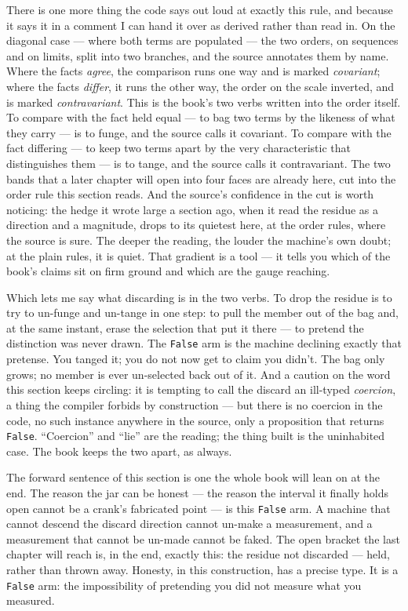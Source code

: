 There is one more thing the code says out loud at exactly this rule, and because it says it in a comment I can hand it
over as derived rather than read in. On the diagonal case --- where both terms are populated --- the two orders, on
sequences and on limits, split into two branches, and the source annotates them by name. Where the facts \emph{agree},
the comparison runs one way and is marked \emph{covariant}; where the facts \emph{differ}, it runs the other way, the
order on the scale inverted, and is marked \emph{contravariant}. This is the book's two verbs written into the order
itself. To compare with the fact held equal --- to bag two terms by the likeness of what they carry --- is to funge,
and the source calls it covariant. To compare with the fact differing --- to keep two terms apart by the very
characteristic that distinguishes them --- is to tange, and the source calls it contravariant. The two bands that a
later chapter will open into four faces are already here, cut into the order rule this section reads. And the source's
confidence in the cut is worth noticing: the hedge it wrote large a section ago, when it read the residue as a
direction and a magnitude, drops to its quietest here, at the order rules, where the source is sure. The deeper the
reading, the louder the machine's own doubt; at the plain rules, it is quiet. That gradient is a tool --- it tells you
which of the book's claims sit on firm ground and which are the gauge reaching.

Which lets me say what discarding is in the two verbs. To drop the residue is to try to un-funge and un-tange in one
step: to pull the member out of the bag and, at the same instant, erase the selection that put it there --- to pretend
the distinction was never drawn. The \verb|False| arm is the machine declining exactly that pretense. You tanged it;
you do not now get to claim you didn't. The bag only grows; no member is ever un-selected back out of it. And a
caution on the word this section keeps circling: it is tempting to call the discard an ill-typed \emph{coercion}, a
thing the compiler forbids by construction --- but there is no coercion in the code, no such instance anywhere in the
source, only a proposition that returns \verb|False|. ``Coercion'' and ``lie'' are the reading; the thing built is the
uninhabited case. The book keeps the two apart, as always.

The forward sentence of this section is one the whole book will lean on at the end. The reason the jar can be honest
--- the reason the interval it finally holds open cannot be a crank's fabricated point --- is this \verb|False| arm. A
machine that cannot descend the discard direction cannot un-make a measurement, and a measurement that cannot be
un-made cannot be faked. The open bracket the last chapter will reach is, in the end, exactly this: the residue not
discarded --- held, rather than thrown away. Honesty, in this construction, has a precise type. It is a \verb|False|
arm: the impossibility of pretending you did not measure what you measured.

